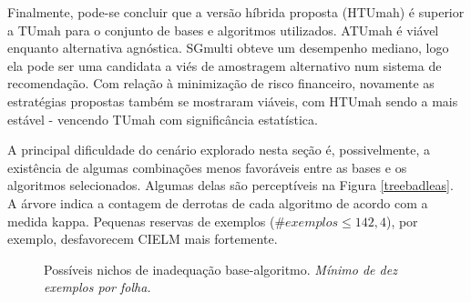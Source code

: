 Finalmente, pode-se concluir que a versão híbrida proposta (HTUmah) é superior a TUmah
para o conjunto de bases e algoritmos utilizados.
ATUmah é viável enquanto alternativa agnóstica.
SGmulti obteve um desempenho mediano,
logo ela pode ser uma candidata a viés de amostragem alternativo num sistema de recomendação.
Com relação à minimização de risco financeiro, 
novamente as estratégias propostas também se mostraram viáveis,
com HTUmah sendo a mais estável - vencendo TUmah com significância estatística.

A principal dificuldade do cenário explorado nesta seção é, possivelmente, a existência de algumas
combinações menos favoráveis entre as bases e os algoritmos selecionados.
Algumas delas são perceptíveis na Figura \ref{treebadleas}.
A árvore indica a contagem de derrotas de cada algoritmo de acordo com a medida kappa.
Pequenas reservas de exemplos ($\#exemplos \leq 142,4$),
por exemplo, desfavorecem CIELM mais fortemente.
\begin{figure}
\begin{center}
\caption{Possíveis nichos de inadequação base-algoritmo.
\textit{Mínimo de dez exemplos por folha.}}
\begin{tikzpicture} [edge from parent/.style={->,above,draw,sloped,midway,gray!30,ultra thick},
text width=2.7cm, align=flush center, grow cyclic,
level 1/.style={level distance=3.2cm,sibling angle=45},
level 2/.style={text width=2cm, font=\footnotesize, level distance=3.2cm,sibling angle=60},
level 3/.style={text width=2cm, font=\footnotesize, level distance=3.2cm,sibling angle=60},
level 4/.style={text width=2cm, font=\footnotesize, level distance=3.2cm,sibling angle=60},
level 5/.style={text width=2cm, font=\footnotesize, level distance=3.2cm,sibling angle=60},
]

\label{treebadleas}
\end{tikzpicture}
\end{center}
\end{figure}

